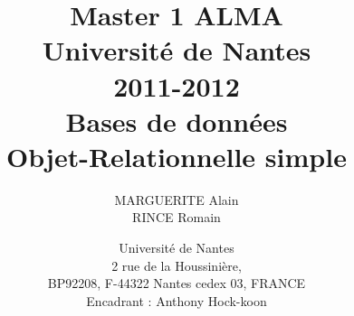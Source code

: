 \documentclass[12pt,a4paper,utf8x]{report}
\title
{
	\normalsize{Master 1 ALMA\\
	Université de Nantes\\
	2011-2012}\\
	\vspace{15mm}
	\Huge{Bases de données \\  Objet-Relationnelle simple}
}
\author{MARGUERITE Alain\\RINCE Romain
	\vspace{45mm}
}
\date
{	
	\normalsize{Université de Nantes \\ 2 rue de la Houssinière,\\ BP92208, F-44322 Nantes cedex 03, FRANCE
	\\ 
	\vspace{5mm}	
	Encadrant : Anthony Hock-koon\\
	}
}
\begin{document}
\maketitle


\tableofcontents
\clearpage

\begin{onehalfspace}





\end{onehalfspace}


\printindex

\appendix
\end{document}
